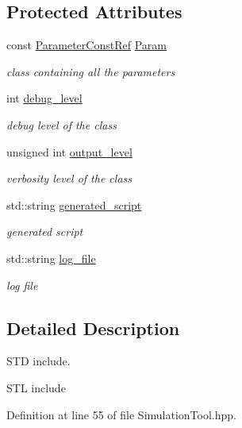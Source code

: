 \subsection*{Protected Attributes}
\begin{DoxyCompactItemize}
\item 
const \hyperlink{Parameter_8hpp_a37841774a6fcb479b597fdf8955eb4ea}{Parameter\+Const\+Ref} \hyperlink{classSimulationTool_adc409fd8f18901e2d0ea4a6ab6690138}{Param}
\begin{DoxyCompactList}\small\item\em class containing all the parameters \end{DoxyCompactList}\item 
int \hyperlink{classSimulationTool_a8fcf300968d03e86e9180626e7f6ec22}{debug\+\_\+level}
\begin{DoxyCompactList}\small\item\em debug level of the class \end{DoxyCompactList}\item 
unsigned int \hyperlink{classSimulationTool_a0fe2cf8bf40f059b60f6d1b84ad391ac}{output\+\_\+level}
\begin{DoxyCompactList}\small\item\em verbosity level of the class \end{DoxyCompactList}\item 
std\+::string \hyperlink{classSimulationTool_a8ddd42da76722ed7095fbcbb11f46af7}{generated\+\_\+script}
\begin{DoxyCompactList}\small\item\em generated script \end{DoxyCompactList}\item 
std\+::string \hyperlink{classSimulationTool_aa927c5fdab04311517034cbec7a9a5c2}{log\+\_\+file}
\begin{DoxyCompactList}\small\item\em log file \end{DoxyCompactList}\end{DoxyCompactItemize}


\subsection{Detailed Description}
S\+TD include. 

S\+TL include 

Definition at line 55 of file Simulation\+Tool.\+hpp.



